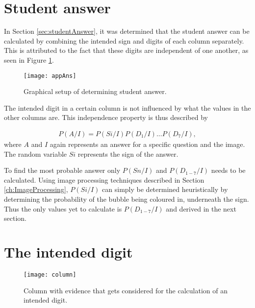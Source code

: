 \section{Student answer}

In Section \ref{sec:studentAnswer}, it was determined that the student answer can be calculated by combining the intended sign and digits of each column separately. This is attributed to the fact that these digits are independent of one another, as seen in Figure \ref{fig:appAns}. 

\begin{figure}
  \centering
  \texttt{[image: appAns]}\\
  \caption{Graphical setup of determining student answer.}
  \label{fig:appAns}
\end{figure}

The intended digit in a certain column is not influenced by what the values in the other columns are. This independence property is thus described by

\begin{align}
  P(A/I) =  P(Si/I)P(D_1/I)...P(D_7/I),
\label{eqn:ansIndep}
\end{align}
where $A$ and $I$ again represents an answer  for a specific question and the image. The random variable $Si$ represents the sign of the answer.

To find the most probable answer only $P(Sn/I)$ and $P(D_{1-7}/I)$ needs to be calculated. Using image processing techniques described in Section \ref{ch:ImageProcessing}, $P(Si/I)$ can simply be determined heuristically by determining the probability of the bubble being coloured in, underneath the sign. Thus the only values yet to calculate is $P(D_{1-7}/I)$ and derived in the next section.

\section{The intended digit}

\begin{figure}
  \centering
  \texttt{[image: column]}\\
  \caption{Column with evidence that gets considered for the calculation of an intended digit.}
  \label{fig:column}
\end{figure}


